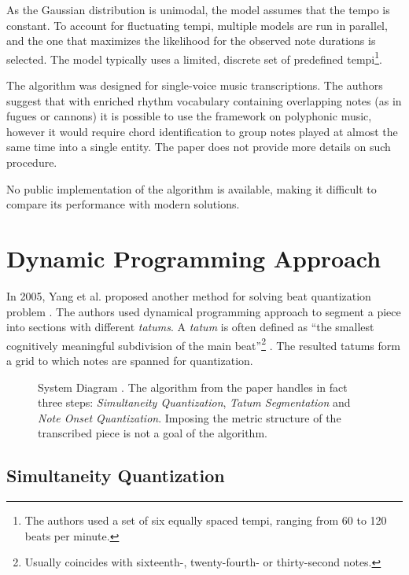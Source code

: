 As the Gaussian distribution is unimodal, the model assumes that the tempo is constant. To account for fluctuating tempi, multiple models are run in parallel, and the one that maximizes the likelihood for the observed note durations is selected. The model typically uses a limited, discrete set of predefined tempi\footnote{The authors used a set of six equally spaced tempi, ranging from 60 to 120 beats per minute.}.

The algorithm was designed for single-voice music transcriptions. The authors suggest that with enriched rhythm vocabulary containing overlapping notes (as in fugues or cannons) it is possible to use the framework on polyphonic music, however it would require chord identification to group notes played at almost the same time into a single entity. The paper does not provide more details on such procedure.

No public implementation of the algorithm is available, making it difficult to compare its performance with modern solutions.

\section{Dynamic Programming Approach}

In 2005, Yang et al. proposed another method for solving beat quantization problem \cite{Yang2005}. The authors used dynamical programming approach to segment a piece into sections with different \emph{tatums}. A \emph{tatum} is often defined as ``the smallest cognitively meaningful
subdivision of the main beat''\footnote{Usually coincides with sixteenth-, twenty-fourth- or thirty-second notes.} \cite{Iyer1997}. The resulted tatums form a grid to which notes are spanned for quantization.

\begin{figure}[!ht]
\centering

\caption[System Diagram.]{System Diagram \cite{Yang2005}. The algorithm from the paper handles in fact three steps: \emph{Simultaneity Quantization}, \emph{Tatum Segmentation} and \emph{Note Onset Quantization}. Imposing the metric structure of the transcribed piece is not a goal of the algorithm.}
\end{figure}

\subsection{Simultaneity Quantization}

